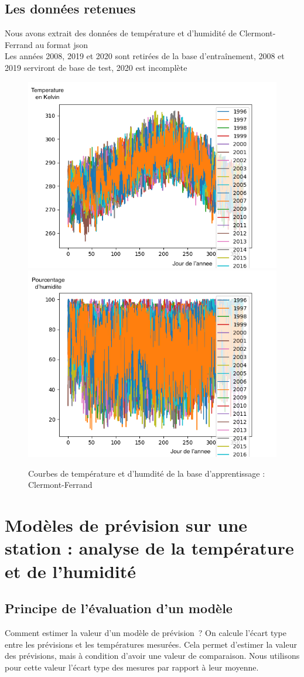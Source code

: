 \documentclass[11pt,a4paper]{article}
\begin{document}
\subsection{Les données retenues}
Nous avons extrait des données de température et d'humidité de Clermont-Ferrand au format json \\
Les années 2008, 2019 et 2020 sont retirées de la base d'entraînement, 2008 et 2019 serviront de base de test, 2020 est incomplète\\
\begin{figure} [!h]
\centering
\includegraphics[width=0.48 \textwidth]{imagesTIPE/temperature.png}\quad
\includegraphics[width=0.48 \textwidth]{imagesTIPE/humidite.png}
\caption{\label{fig:190101Lolita} Courbes de température et d'humdité de la base d'apprentissage : Clermont-Ferrand}
\end{figure}
\section{Modèles de prévision sur une station : analyse de la température et de l'humidité}
\subsection{Principe de l'évaluation d'un modèle}
Comment estimer la valeur d'un modèle de prévision~? On calcule l'écart type entre les prévisions et les températures mesurées. Cela permet d'estimer la valeur des prévisions, mais à condition d'avoir une valeur de comparaison. Nous utilisons pour cette valeur l'écart type des mesures par rapport à leur moyenne.
\end{document}
